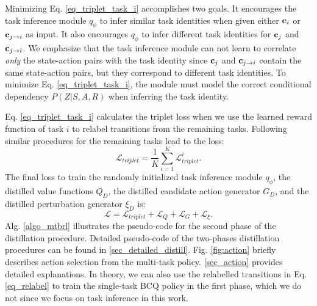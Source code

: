 Minimizing Eq. \ref{eq_triplet_task_i} accomplishes two goals. It encourages the task inference module $q_\phi$ to infer similar task identities when given either ${\bf c}_i$ or ${\bf c}_{j\rightarrow{i}}$ as input. It also encourages $q_\phi$ to infer different task identities for ${\bf c}_j$ and ${\bf c}_{j\rightarrow{i}}$. We emphasize that the task inference module can not learn to correlate \textit{only} the state-action pairs with the task identity since ${\bf c}_j$ and ${\bf c}_{j\rightarrow{i}}$ contain the same state-action pairs, but they correspond to different task identities. To minimize Eq. \ref{eq_triplet_task_i}, the module must model the correct conditional dependency $P(Z|S, A, R)$ when inferring the task identity.

Eq. \ref{eq_triplet_task_i} calculates the triplet loss when we use the learned reward function of task $i$ to relabel transitions from the remaining tasks. Following similar procedures for the remaining tasks lead to the loss:
\begin{equation}\label{eq_triplet_all_task}
    \mathcal{L}_{triplet} =  \frac{1}{K} \sum_{i=1}^{K} \mathcal{L}^i_{triplet}.
\end{equation}
The final loss to train the randomly initialized task inference module $q_\phi$, the distilled value functions $Q_D$, the distilled candidate action generator $G_D$, and the distilled perturbation generator $\xi_D$ is:
\begin{equation}\label{eq_loss_final}
    \mathcal{L} = \mathcal{L}_{triplet} + \mathcal{L}_Q + \mathcal{L}_G + \mathcal{L}_\xi.
\end{equation}
Alg. \ref{algo_mtbrl} illustrates the pseudo-code for the second phase of the distillation procedure. Detailed pseudo-code of the two-phases distillation procedures can be found in \autoref{sec_detailed_distill}. Fig. \ref{fig:action} briefly describes action selection from the multi-task policy. \autoref{sec_action} provides detailed explanations. In theory, we can also use the relabelled transitions in Eq. \ref{eq_relabel} to train the single-task BCQ policy in the first phase, which we do not since we focus on task inference in this work.
